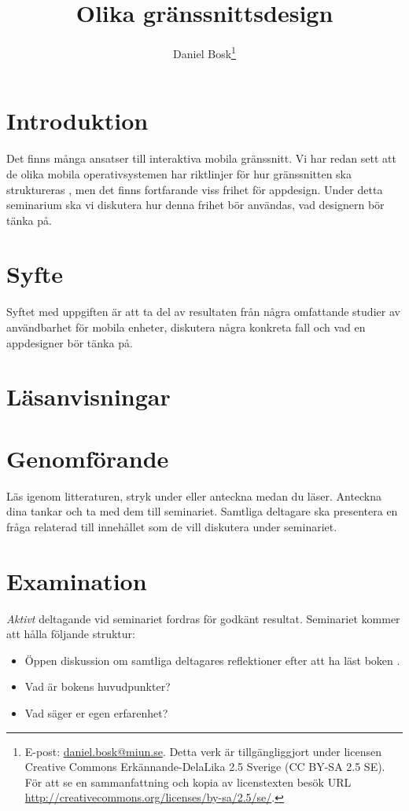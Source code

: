 \documentclass[a4paper,logo,nocourse]{miunasgn}
\title{Olika gränssnittsdesign}
\author{Daniel Bosk\footnote{%
	E-post: \href{mailto:daniel.bosk@miun.se}{daniel.bosk@miun.se}.
  Detta verk är tillgängliggjort under licensen Creative Commons 
  Erkännande-DelaLika 2.5 Sverige (CC BY-SA 2.5 SE).
	För att se en sammanfattning och kopia av licenstexten besök URL 
	\url{http://creativecommons.org/licenses/by-sa/2.5/se/}.
}}
\date{\svnId}
\begin{document}
\maketitle
\thispagestyle{foot}
\tableofcontents


\section{Introduktion}
\label{sec:Introduktion}
Det finns många ansatser till interaktiva mobila gränssnitt.
Vi har redan sett att de olika mobila operativsystemen har riktlinjer för hur 
gränssnitten ska struktureras \cite{Nokia2011n9u,Android2012d,Apple2012hig}, 
men det finns fortfarande viss frihet för appdesign.
Under detta seminarium ska vi diskutera hur denna frihet bör användas, vad 
designern bör tänka på.


\section{Syfte}
\label{sec:Syfte}
Syftet med uppgiften är att ta del av resultaten från några omfattande studier 
av användbarhet för mobila enheter, diskutera några konkreta fall och vad en 
appdesigner bör tänka på.


\section{Läsanvisningar}
\label{sec:Lasanvisningar}



\section{Genomförande}
\label{sec:Genomforande}
Läs igenom litteraturen, stryk under eller anteckna medan du läser.
Anteckna dina tankar och ta med dem till seminariet.
Samtliga deltagare ska presentera en fråga relaterad till innehållet som de 
vill diskutera under seminariet.


\section{Examination}
\label{sec:Examination}
\emph{Aktivt} deltagande vid seminariet fordras för godkänt resultat.
Seminariet kommer att hålla följande struktur:
\begin{itemize}
  \item Öppen diskussion om samtliga deltagares reflektioner efter att ha läst 
    boken \cite{Nielsen2013mu}.

  \item Vad är bokens huvudpunkter?

  \item Vad säger er egen erfarenhet?

\end{itemize}


\printbibliography
\end{document}
